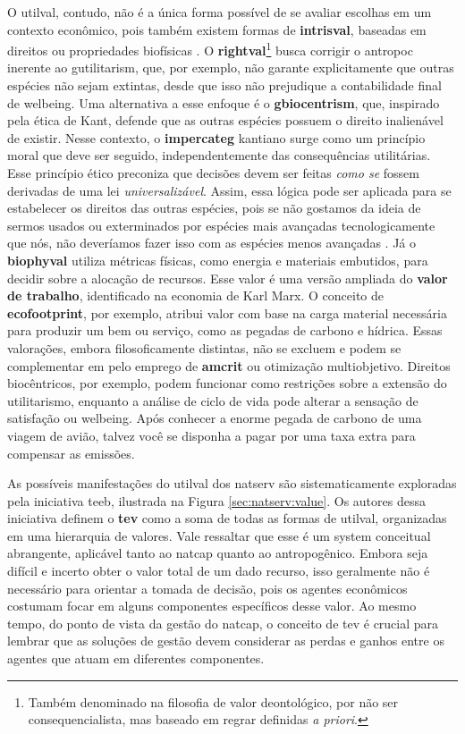 \documentclass[./main.tex]{subfiles}
\begin{document}
\par O \gls{utilval}, contudo, não é a única forma possível de se avaliar escolhas em um contexto econômico, pois também existem formas de \textbf{\gls{intrisval}}, baseadas em direitos ou propriedades biofísicas \cite{kumar2012economics}. O \textbf{\gls{rightval}}\footnote{Também denominado na filosofia de valor deontológico, por não ser consequencialista, mas baseado em regrar definidas \textit{a priori}.} busca corrigir o \gls{antropoc} inerente ao \gls{gutilitarism}, que, por exemplo, não garante explicitamente que outras espécies não sejam extintas, desde que isso não prejudique a contabilidade final de \gls{welbeing}. Uma alternativa a esse enfoque é o \textbf{\gls{gbiocentrism}}, que, inspirado pela ética de Kant, defende que as outras espécies possuem o direito inalienável de existir. Nesse contexto, o \textbf{\gls{impercateg}} kantiano surge como um princípio moral que deve ser seguido, independentemente das consequências utilitárias. Esse princípio ético preconiza que decisões devem ser feitas \textit{como se} fossem derivadas de uma lei \textit{universalizável}. Assim, essa lógica pode ser aplicada para se estabelecer os direitos das outras espécies, pois se não gostamos da ideia de sermos usados ou exterminados por espécies mais avançadas tecnologicamente que nós, não deveríamos fazer isso com as espécies menos avançadas \cite{daily1997}. Já o \textbf{\gls{biophyval}} utiliza métricas físicas, como energia e materiais embutidos, para decidir sobre a alocação de recursos. Esse valor é uma versão ampliada do \textbf{valor de trabalho}, identificado na economia de Karl Marx. O conceito de \textbf{\gls{ecofootprint}}, por exemplo, atribui valor com base na carga material necessária para produzir um bem ou serviço, como as pegadas de carbono e hídrica. Essas valorações, embora filosoficamente distintas, não se excluem e podem se complementar em pelo emprego de \textbf{\gls{amcrit}} ou otimização multiobjetivo. Direitos biocêntricos, por exemplo, podem funcionar como restrições sobre a extensão do utilitarismo, enquanto a análise de ciclo de vida pode alterar a sensação de satisfação ou \gls{welbeing}. Após conhecer a enorme pegada de carbono de uma viagem de avião, talvez você se disponha a pagar por uma taxa extra para compensar as emissões.

\par As possíveis manifestações do \gls{utilval} dos \gls{natserv} são sistematicamente exploradas pela iniciativa \acrfull{teeb}, ilustrada na Figura \ref{sec:natserv:value}. Os autores dessa iniciativa definem o \textbf{\gls{tev}} como a soma de todas as formas de \gls{utilval}, organizadas em uma hierarquia de valores. Vale ressaltar que esse é um \gls{system} conceitual abrangente, aplicável tanto ao \gls{natcap} quanto ao antropogênico. Embora seja difícil e incerto obter o valor total de um dado recurso, isso geralmente não é necessário para orientar a tomada de decisão, pois os agentes econômicos costumam focar em alguns componentes específicos desse valor. Ao mesmo tempo, do ponto de vista da gestão do \gls{natcap}, o conceito de \gls{tev} é crucial para lembrar que as soluções de gestão devem considerar as perdas e ganhos entre os agentes que atuam em diferentes componentes.
\end{document}
